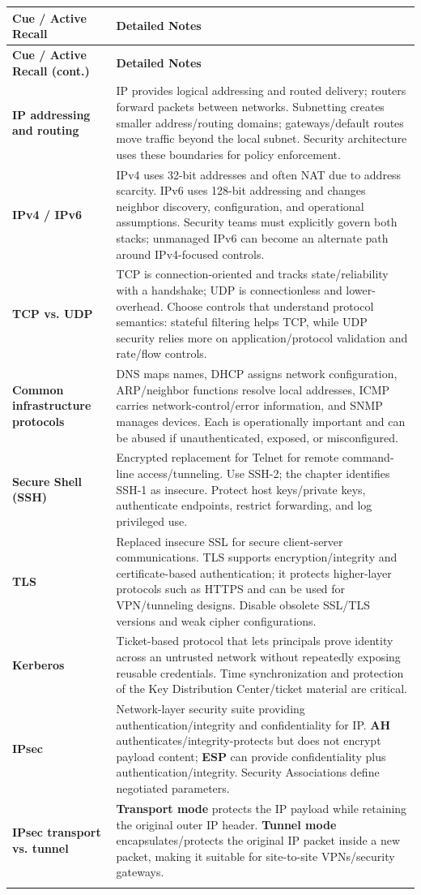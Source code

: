 \documentclass[10pt,letterpaper]{article}
\makeatletter
\newenvironment{cornell}{\rowcolors{2}{white}{notebg}\begin{longtable}{@{}>{\raggedright\arraybackslash\columncolor{cuebg}\color{navy}\bfseries}p{0.285\textwidth}>{\raggedright\arraybackslash}p{0.65\textwidth}@{}}\rowcolor{navy}\color{white}\textbf{Cue / Active Recall} & \color{white}\textbf{Detailed Notes}\\ \hline\endfirsthead\rowcolor{navy}\color{white}\textbf{Cue / Active Recall (cont.)} & \color{white}\textbf{Detailed Notes}\\ \hline\endhead}{\end{longtable}}
\newcommand{\noterow}[2]{#1 & #2\\\arrayrulecolor{line}\hline}\newcommand{\source}[1]{\par{\footnotesize\color{teal}\textit{Source: CBK, #1}}\par}
\makeatother
\begin{document}
\begin{cornell}
\noterow{IP addressing and routing}{IP provides logical addressing and routed delivery; routers forward packets between networks. Subnetting creates smaller address/routing domains; gateways/default routes move traffic beyond the local subnet. Security architecture uses these boundaries for policy enforcement.}
\noterow{IPv4 / IPv6}{IPv4 uses 32-bit addresses and often NAT due to address scarcity. IPv6 uses 128-bit addressing and changes neighbor discovery, configuration, and operational assumptions. Security teams must explicitly govern both stacks; unmanaged IPv6 can become an alternate path around IPv4-focused controls.}
\noterow{TCP vs. UDP}{TCP is connection-oriented and tracks state/reliability with a handshake; UDP is connectionless and lower-overhead. Choose controls that understand protocol semantics: stateful filtering helps TCP, while UDP security relies more on application/protocol validation and rate/flow controls.}
\noterow{Common infrastructure protocols}{DNS maps names, DHCP assigns network configuration, ARP/neighbor functions resolve local addresses, ICMP carries network-control/error information, and SNMP manages devices. Each is operationally important and can be abused if unauthenticated, exposed, or misconfigured.}
\noterow{Secure Shell (SSH)}{Encrypted replacement for Telnet for remote command-line access/tunneling. Use SSH-2; the chapter identifies SSH-1 as insecure. Protect host keys/private keys, authenticate endpoints, restrict forwarding, and log privileged use.}
\noterow{TLS}{Replaced insecure SSL for secure client-server communications. TLS supports encryption/integrity and certificate-based authentication; it protects higher-layer protocols such as HTTPS and can be used for VPN/tunneling designs. Disable obsolete SSL/TLS versions and weak cipher configurations.}
\noterow{Kerberos}{Ticket-based protocol that lets principals prove identity across an untrusted network without repeatedly exposing reusable credentials. Time synchronization and protection of the Key Distribution Center/ticket material are critical.}
\noterow{IPsec}{Network-layer security suite providing authentication/integrity and confidentiality for IP. \textbf{AH} authenticates/integrity-protects but does not encrypt payload content; \textbf{ESP} can provide confidentiality plus authentication/integrity. Security Associations define negotiated parameters.}
\noterow{IPsec transport vs. tunnel}{\textbf{Transport mode} protects the IP payload while retaining the original outer IP header. \textbf{Tunnel mode} encapsulates/protects the original IP packet inside a new packet, making it suitable for site-to-site VPNs/security gateways.}

\end{cornell}
\end{document}
